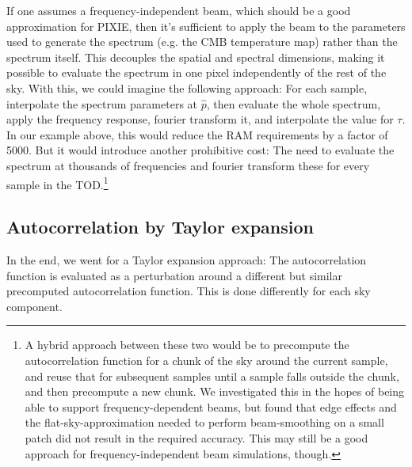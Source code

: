 \documentclass{article}
\begin{document}
If one assumes a frequency-independent beam, which should be a good approximation
for PIXIE, then it's sufficient to apply the beam to the parameters used to generate
the spectrum (e.g. the CMB temperature map) rather than the spectrum itself. This
decouples the spatial and spectral dimensions, making it possible to evaluate the
spectrum in one pixel independently of the rest of the sky. With this, we could
imagine the following approach: For each sample, interpolate the spectrum parameters
at $\hat p$, then evaluate the whole spectrum, apply the frequency response,
fourier transform it,
and interpolate the value for $\tau$. In our example above, this would reduce
the RAM requirements by a factor of 5000. But it would introduce another prohibitive
cost: The need to evaluate the spectrum at thousands of frequencies and fourier transform
these for every sample in the TOD.\footnote{
A hybrid approach between these two would be to precompute the autocorrelation function
for a chunk of the sky around the current sample, and reuse that for subsequent samples
until a sample falls outside the chunk, and then precompute a new chunk. We investigated
this in the hopes of being able to support frequency-dependent beams, but found that
edge effects and the flat-sky-approximation needed to perform beam-smoothing on a small
patch did not result in the required accuracy. This may still be a good approach for
frequency-independent beam simulations, though.}

\subsection{Autocorrelation by Taylor expansion}
In the end, we went for a Taylor expansion approach: The autocorrelation function
is evaluated as a perturbation around a different but similar
precomputed autocorrelation function. This is done differently for each sky component.
\end{document}
